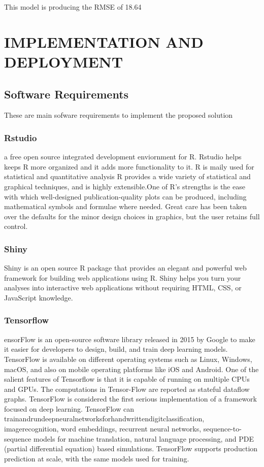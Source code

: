  This model is producing the RMSE of 18.64

\chapter{IMPLEMENTATION AND  DEPLOYMENT}
\section{Software Requirements}
These are main sofware requirements to implement the proposed solution
\subsection{Rstudio}
a free open source integrated development enviornment for R. Rstudio helps keeps R more organized and it adds more functionality to it. R is maily used for statistical and quantitative analysis R provides a wide variety of statistical
and graphical techniques, and is highly extensible.One of R’s strengths is the ease with which well-designed publication-quality plots can be produced, including mathematical symbols and formulae where needed. Great care has been taken over the defaults for the minor design choices in graphics, but the user retains full control.

\subsection{Shiny}
Shiny is an open source R package that provides an elegant and powerful web framework for building web applications using R. Shiny helps you turn your analyses into interactive web applications without requiring HTML, CSS, or JavaScript knowledge.\pagebreak

\subsection{Tensorflow}
ensorFlow is an open-source software library released in 2015 by Google to make it
easier for developers to design, build, and train deep learning models. TensorFlow is
available on different operating systems such as Linux, Windows, macOS, and also on
mobile operating platforms like iOS and Android. One of the salient features of Tensorflow  is that it is capable of running on multiple CPUs and GPUs. The computations
in Tensor-Flow are reported as stateful dataflow graphs. TensorFlow is considered the
first serious implementation of a framework focused on deep learning. TensorFlow can
trainandrundeepneuralnetworksforhandwrittendigitclassification, imagerecognition,
word embeddings, recurrent neural networks, sequence-to-sequence models for machine
translation, natural language processing, and PDE (partial differential equation) based
simulations. TensorFlow supports production prediction at scale, with the same models
used for training.

